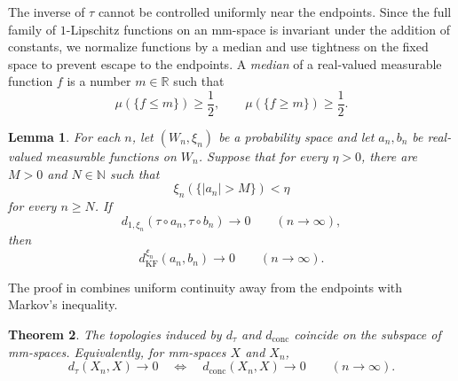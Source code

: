 \documentclass[11pt]{amsart}
\theoremstyle{plain}
\newtheorem{theorem}{Theorem}[section]
\newtheorem{lemma}[theorem]{Lemma}
\theoremstyle{definition}
\theoremstyle{remark}
\newcommand{\R}{\mathbb R}
\newcommand{\dconc}{d_{\mathrm{conc}}}
\newcommand{\dtau}{d_{\tau}}
\newcommand{\kf}{d_{\operatorname{KF}}}
\begin{document}
The inverse of $\tau$ cannot be controlled uniformly near the endpoints. Since the full family of $1$-Lipschitz functions on an mm-space is invariant under the addition of constants, we normalize functions by a median and use tightness on the fixed space to prevent escape to the endpoints. A \emph{median} of a real-valued measurable function $f$ is a number $m\in\R$ such that
\[
\mu(\{f\leq m\})\geq\frac12,\qquad
\mu(\{f\geq m\})\geq\frac12.
\]

\begin{lemma}
\label{lem:inversion-tightness}
For each $n$, let $(W_n,\xi_n)$ be a probability space and let $a_n,b_n$ be real-valued measurable functions on $W_n$. Suppose that for every $\eta>0$, there are $M>0$ and $N\in\mathbb N$ such that
\[
\xi_n(\{|a_n|>M\})<\eta
\]
for every $n\geq N$. If
\[
d_{1,\xi_n}(\tau\circ a_n,\tau\circ b_n)\longrightarrow0
\qquad(n\to\infty),
\]
then
\[
\kf^{\xi_n}(a_n,b_n)\longrightarrow0
\qquad(n\to\infty).
\]
\end{lemma}

The proof in  combines uniform continuity away from the endpoints with Markov's inequality.

\begin{theorem}
\label{thm:mm-topologies}
The topologies induced by $\dtau$ and $\dconc$ coincide on the subspace of mm-spaces. Equivalently, for mm-spaces $X$ and $X_n$,
\[
\dtau(X_n,X)\longrightarrow0
\quad\Longleftrightarrow\quad
\dconc(X_n,X)\longrightarrow0
\qquad(n\to\infty).
\]
\end{theorem}
\end{document}
